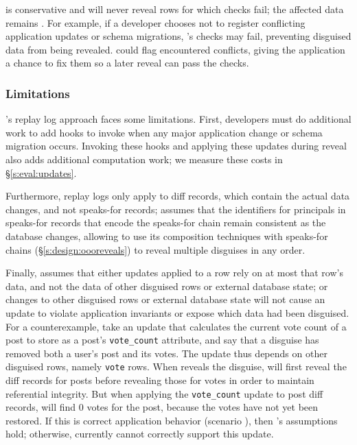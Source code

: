 \sys is conservative and will never reveal rows for which checks fail; the
affected data remains \xxed.  For example, if a developer chooses not to
register conflicting application updates or schema migrations, \sys's checks may
fail, preventing disguised data from being revealed.
%
\sys could flag encountered conflicts, giving the application a chance to fix
them so a later reveal can pass the checks.

\subsubsection{Limitations}
\label{s:design:updates:limitations}
\sys's replay log approach faces some limitations.
%
First, developers must do additional work to add hooks to invoke \sys when any
major application change or schema migration occurs. Invoking these hooks and
applying these updates during reveal also adds additional computation work; we
measure these costs in \S\ref{s:eval:updates}.
%

%
Furthermore, replay logs only apply to diff records, which contain the actual data
changes, and not speaks-for records; \sys assumes that the identifiers for
principals in speaks-for records that encode the speaks-for chain remain
consistent as the database changes, allowing \sys to use its composition
techniques with speaks-for chains (\S\ref{s:design:oooreveals}) to reveal multiple disguises in any order.
%

%
Finally, \sys assumes that either \one{} updates applied to a row rely on at
most that row's data, and not the data of other disguised rows or external
database state; or \two{} changes to other disguised rows or external database
state will not cause an update to violate application invariants or expose which
data had been disguised.
%
For a counterexample, take an update that calculates the current vote count of a
post to
store as a post's \texttt{vote\_count} attribute, and say that a disguise has
removed both a user's post and its votes.
%
The update thus depends on other disguised rows, namely \texttt{vote}
rows.
%
When \sys reveals the disguise, \sys will first reveal the diff records for
posts before revealing those for votes in order to maintain referential
integrity. But when applying the \texttt{vote\_count} update to post diff
records, \sys will find 0 votes for the post, because the votes have not yet
been restored.
%
If this is correct application behavior (scenario \two{}), then \sys's
assumptions hold; otherwise, \sys currently cannot correctly support this update.

